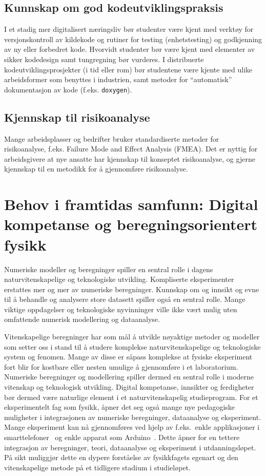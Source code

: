 \documentclass{article}
\begin{document}
\subsection{Kunnskap om god kodeutviklingspraksis}
I et stadig mer digitalisert næringsliv bør studenter være kjent med verktøy for versjonskontroll av kildekode og rutiner for testing (enhetstesting) og godkjenning av ny eller forbedret kode. Hvorvidt studenter bør være kjent med elementer av sikker kodedesign samt tungregning bør vurderes. I distribuerte kodeutviklingsprosjekter (i tid eller rom) bør studentene være kjente med ulike  arbeidsformer som benyttes i industrien, samt metoder for ``automatisk'' dokumentasjon av kode (f.eks. \verb+doxygen+).

\subsection{Kjennskap til risikoanalyse}
Mange arbeidsplasser og bedrifter bruker standardiserte metoder for risikoanalyse, f.eks. Failure Mode and Effect Analysis (FMEA). Det er nyttig for arbeidsgivere at nye ansatte har kjennskap til konseptet risikoanalyse, og gjerne kjennskap til en metodikk for å gjennomføre risikoanalyse.

\section{Behov i framtidas samfunn: Digital kompetanse og beregningsorientert fysikk}\label{sec:beregninger}

Numeriske modeller og beregninger spiller en sentral rolle i dagens naturvitenskapelige og teknologiske utvikling. Kompliserte eksperimenter erstattes mer og mer av numeriske beregninger. Kunnskap om og innsikt og evne til å behandle og analysere store datasett spiller også en sentral rolle. Mange viktige oppdagelser og teknologiske nyvinninger ville ikke vært mulig uten omfattende numerisk modellering og dataanalyse.  

Vitenskapelige beregninger har som mål å utvikle nøyaktige metoder og modeller som setter oss i stand til å studere komplekse naturvitenskapelige og teknologiske system og fenomen. Mange av disse er såpass komplekse at fysiske eksperiment fort blir for kostbare eller nesten umulige å gjennomføre i et laboratorium. Numeriske beregninger og modellering spiller dermed en sentral rolle i moderne vitenskap og teknologisk utvikling. 
Digital kompetanse, innsikter og ferdigheter bør dermed være naturlige element i et naturvitenskapelig studieprogram. For et eksperimentelt fag som fysikk, åpner det seg også mange nye pedagogiske muligheter i integrasjonen av numeriske beregninger, dataanalyse og eksperiment. Mange eksperiment kan nå gjennomføres ved hjelp av f.eks.\ enkle applikasjoner i smarttelefoner~\cite{phyphox} og enkle apparat som Arduino~\cite{arduino}. Dette åpner for en tettere integrasjon av beregninger, teori, dataanalyse og eksperiment i utdanningsløpet. På sikt muliggjør dette en dypere forståelse av fysikkfagets egenart og den vitenskapelige metode på et tidligere stadium i studieløpet.
\end{document}

